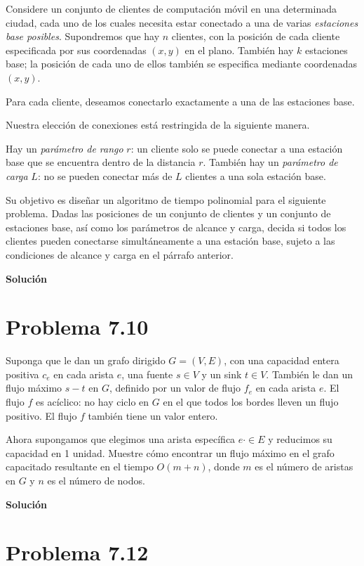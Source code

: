 \documentclass{article}
\begin{document}
Considere un conjunto de clientes de computación móvil en una determinada
ciudad, cada uno de los cuales necesita estar conectado a una de varias
\textit{estaciones base posibles}. Supondremos que hay $n$ clientes, con la
posición de cada cliente especificada por sus coordenadas $(x, y)$ en el plano.
También hay $k$ estaciones base; la posición de cada uno de ellos también se
especifica mediante coordenadas $(x, y)$.

Para cada cliente, deseamos conectarlo exactamente a una de las estaciones base.

Nuestra elección de conexiones está restringida de la siguiente manera.

Hay un \textit{parámetro de rango} $r$: un cliente solo se puede conectar a una
estación base que se encuentra dentro de la distancia $r$. También hay un
\textit{parámetro de carga} $L$: no se pueden conectar más de $L$ clientes a una
sola estación base.

Su objetivo es diseñar un algoritmo de tiempo polinomial para el siguiente
problema. Dadas las posiciones de un conjunto de clientes y un conjunto de
estaciones base, así como los parámetros de alcance y carga, decida si todos los
clientes pueden conectarse simultáneamente a una estación base, sujeto a las
condiciones de alcance y carga en el párrafo anterior.



\textbf{Solución}

\section*{Problema 7.10}

Suponga que le dan un grafo dirigido $G = (V , E)$, con una capacidad entera
positiva $c_e$ en cada arista $e$, una fuente $s \in V$ y un sink $t \in V$.
También le dan un flujo máximo $s-t$ en $G$, definido por un valor de flujo
$f_e$ en cada arista $e$. El flujo $f$ es acíclico: no hay ciclo en $G$ en el
que todos los bordes lleven un flujo positivo. El flujo $f$ también tiene un
valor entero.

Ahora supongamos que elegimos una arista específica $e \cdot \in E$ y reducimos
su capacidad en 1 unidad. Muestre cómo encontrar un flujo máximo en el grafo
capacitado resultante en el tiempo $O(m + n)$, donde $m$ es el número de aristas
en $G$ y $n$ es el número de nodos.

\textbf{Solución}

\section*{Problema 7.12}
\end{document}
